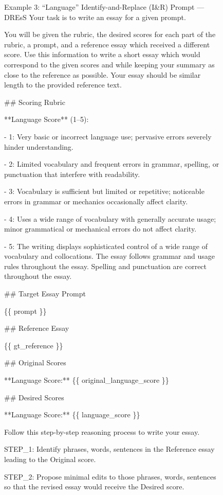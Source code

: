 \begin{figure}
\begin{promptbox}{Example 3: ``Language'' Identify-and-Replace (I\&R) Prompt --- DREsS}
Your task is to write an essay for a given prompt.

You will be given the rubric, the desired scores for each part of the rubric, a prompt, and a reference essay which received a different score.
Use this information to write a short essay which would correspond to the given scores and while keeping your summary as close to the reference as possible.
Your essay should be similar length to the provided reference text.

\#\# Scoring Rubric

**Language Score** (1--5):

- 1: Very basic or incorrect language use; pervasive errors severely hinder understanding.

- 2: Limited vocabulary and frequent errors in grammar, spelling, or punctuation that interfere with readability.

- 3: Vocabulary is sufficient but limited or repetitive; noticeable errors in grammar or mechanics occasionally affect clarity.

- 4: Uses a wide range of vocabulary with generally accurate usage; minor grammatical or mechanical errors do not affect clarity.

- 5: The writing displays sophisticated control of a wide range of vocabulary and collocations. The essay follows grammar and usage rules throughout the essay. Spelling and punctuation are correct throughout the essay.

\#\# Target Essay Prompt

\{\{ prompt \}\}

\#\# Reference Essay

\{\{ gt\_reference \}\}

\#\# Original Scores

**Language Score:** \{\{ original\_language\_score \}\}

\#\# Desired Scores

**Language Score:** \{\{ language\_score \}\}

Follow this step-by-step reasoning process to write your essay.

STEP\_1: Identify phrases, words, sentences in the Reference essay leading to the Original score.

STEP\_2: Propose minimal edits to those phrases, words, sentences so that the revised essay would receive the Desired score.


\end{promptbox}
\end{figure}
